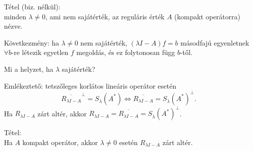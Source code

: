 \documentclass[12pt,a4paper]{scrartcl}
\newenvironment{tetel}{}{}
\begin{document}
\begin{tetel}

Tétel (biz. nélkül):\\
minden \(\lambda \neq 0\), ami nem sajátérték, az reguláris érték \(A\)
(kompakt operátorra) nézve.

\end{tetel}

Következmény: ha \(\lambda \neq 0\) nem sajátérték,
\(\left( {\lambda I - A} \right)f = b\) másodfajú egyenletnek
\(\forall b\)-re létezik egyetlen \(f\) megoldás, és ez folytonosan függ
\(b\)-től.

Mi a helyzet, ha \(\lambda\) sajátérték?

Emlékeztető: tetszőleges korlátos lineáris operátor esetén
\[\left. {\overline{R_{\lambda I-A}}}^{\bot} = S_{\overline{\lambda}}\left( A^{*} \right)\Leftrightarrow\overline{R_{\lambda I-A}} = S_{\overline{\lambda}}\left( A^{*} \right)^{\bot}. \right.\]Ha
\(R_{\lambda I - A}\) zárt altér, akkor
\(R_{\lambda I - A} = \overline{R_{\lambda I-A}} = S_{\overline{\lambda}}\left( A^{*} \right)^{\bot}\).

\begin{tetel}

Tétel:\\
Ha \(A\) kompakt operátor, akkor \(\lambda \neq 0\) esetén
\(R_{\lambda I - A}\) zárt altér.

\end{tetel}
\end{document}
